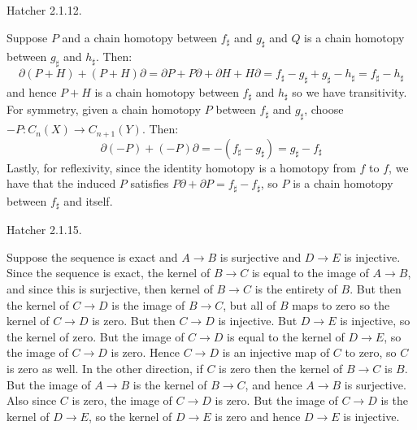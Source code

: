 \documentclass{book}                                                           %
\begin{document}
\begin{problem}
    Hatcher 2.1.12.
\end{problem}
\begin{solution}
    Suppose $P$ and a chain homotopy between $f_{\sharp}$ and $g_{\sharp}$
    and $Q$ is a chain homotopy between $g_{\sharp}$ and $h_{\sharp}$.
    Then:
    \begin{equation}
        \partial(P+H)+(P+H)\partial
        =\partial{P}+P\partial+\partial{H}+H\partial
        =f_{\sharp}-g_{\sharp}+g_{\sharp}-h_{\sharp}
        =f_{\sharp}-h_{\sharp}
    \end{equation}
    and hence $P+H$ is a chain homotopy between $f_{\sharp}$ and
    $h_{\sharp}$ so we have transitivity. For symmetry, given a chain
    homotopy $P$ between $f_{\sharp}$ and $g_{\sharp}$, choose
    $\minus{P}:C_{n}(X)\rightarrow{C}_{n+1}(Y)$. Then:
    \begin{equation}
        \partial(\minus{P})+(\minus{P})\partial
        =\minus(f_{\sharp}-g_{\sharp})=g_{\sharp}-f_{\sharp}
    \end{equation}
    Lastly, for reflexivity, since the identity homotopy is a homotopy from
    $f$ to $f$, we have that the induced $P$ satisfies
    $P\partial+\partial{P}=f_{\sharp}-f_{\sharp}$, so $P$ is a chain
    homotopy between $f_{\sharp}$ and itself.
\end{solution}
\begin{problem}
    Hatcher 2.1.15.
\end{problem}
\begin{solution}
    Suppose the sequence is exact and $A\rightarrow{B}$ is surjective and
    $D\rightarrow{E}$ is injective. Since the sequence is exact, the kernel
    of $B\rightarrow{C}$ is equal to the image of $A\rightarrow{B}$, and
    since this is surjective, then kernel of $B\rightarrow{C}$ is the
    entirety of $B$. But then the kernel of $C\rightarrow{D}$ is the image
    of $B\rightarrow{C}$, but all of $B$ maps to zero so the kernel of
    $C\rightarrow{D}$ is zero. But then $C\rightarrow{D}$ is injective. But
    $D\rightarrow{E}$ is injective, so
    the kernel of zero. But the image of $C\rightarrow{D}$ is equal to the
    kernel of $D\rightarrow{E}$, so the image of $C\rightarrow{D}$ is zero.
    Hence $C\rightarrow{D}$ is an injective map of $C$ to zero, so $C$ is
    zero as well. In the other direction, if $C$ is zero then the kernel of
    $B\rightarrow{C}$ is $B$. But the image of $A\rightarrow{B}$ is the
    kernel of $B\rightarrow{C}$, and hence $A\rightarrow{B}$ is surjective.
    Also since $C$ is zero, the image of $C\rightarrow{D}$ is zero. But the
    image of $C\rightarrow{D}$ is the kernel of $D\rightarrow{E}$, so the
    kernel of $D\rightarrow{E}$ is zero and hence $D\rightarrow{E}$ is
    injective.
\end{solution}
\end{document}
